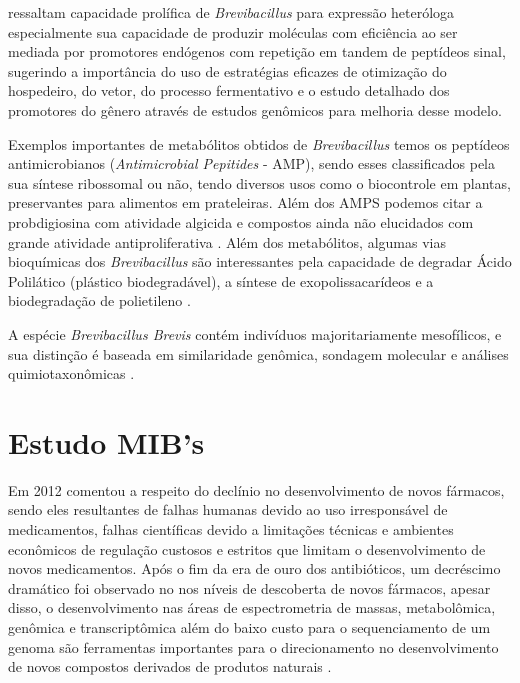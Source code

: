  ressaltam  capacidade prolífica de \textit{Brevibacillus} para expressão heteróloga
especialmente sua capacidade de produzir moléculas com eficiência ao ser mediada por promotores endógenos
com repetição em tandem de peptídeos sinal, sugerindo a importância do uso de estratégias eficazes de otimização do hospedeiro, do vetor,
do processo fermentativo e o estudo detalhado dos promotores do gênero através de estudos genômicos para melhoria desse modelo.

Exemplos importantes de metabólitos obtidos de \textit{Brevibacillus} temos os peptídeos antimicrobianos (\textit{Antimicrobial Pepitides} - AMP),
sendo esses classificados pela sua síntese ribossomal ou não, tendo diversos usos como o biocontrole em plantas, preservantes
para alimentos em prateleiras\cite{yang2018antimicrobial}. Além dos AMPS podemos citar a probdigiosina com atividade algicida e compostos ainda não
elucidados com grande atividade antiproliferativa \cite{zhang2022transcriptome,arumugam2018isolation}.
Além dos metabólitos, algumas vias bioquímicas dos \textit{Brevibacillus} são interessantes pela capacidade de
degradar Ácido Polilático (plástico biodegradável), a síntese de exopolissacarídeos e a 
biodegradação de polietileno \cite{yu2022comparison,yildiz2015genomic,hadad2005biodegradation,ali2022screening}.

A espécie \textit{Brevibacillus Brevis} contém indivíduos majoritariamente mesofílicos, e
sua distinção é baseada em similaridade genômica, sondagem molecular e análises 
quimiotaxonômicas \cite{ray2020brevibacillus}.  

\section{Estudo MIB's}
Em 2012  comentou a respeito do declínio no desenvolvimento de novos
fármacos, sendo eles resultantes de falhas humanas devido ao uso irresponsável de medicamentos,
falhas científicas devido a limitações técnicas e ambientes econômicos de regulação custosos e estritos
que limitam o desenvolvimento de novos medicamentos.
Após o fim da era de ouro dos antibióticos, um decréscimo dramático foi observado no nos níveis
de descoberta de novos fármacos, apesar disso, o desenvolvimento nas áreas de espectrometria de massas,
metabolômica, genômica e transcriptômica além do baixo custo para o sequenciamento de um genoma são
ferramentas importantes para o direcionamento no desenvolvimento de novos compostos derivados de produtos naturais \cite{katz2016natural}. 

